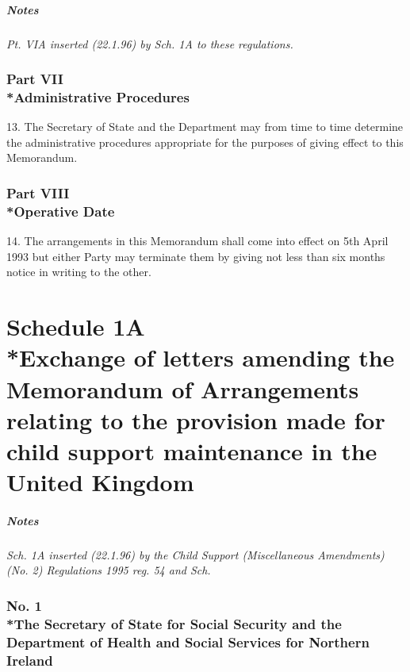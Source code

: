 \documentclass[a4paper]{article}
\newcommand{\parthead}{}
\newcommand\amendment[1]{\subsubsection*{Notes}{\itshape\frenchspacing\footnotesize #1 \par}}
\begin{document}
\amendment{
Pt. VIA inserted (22.1.96) by Sch. 1A to these regulations.
}

\section[Part VII --- Administrative Procedures]{Part VII\\*Administrative Procedures}

\renewcommand\parthead{--- Schedule 1 Part VII}

13.   The Secretary of State and the Department may from time to time determine the administrative procedures appropriate for the purposes of giving effect to this Memorandum.

\section[Part VIII --- Operative Date]{Part VIII\\*Operative Date}

\renewcommand\parthead{--- Schedule 1 Part VIII}

14.   The arrangements in this Memorandum shall come into effect on 5th April 1993 but either Party may terminate them by giving not less than six months notice in writing to the other.

\part[Schedule 1A --- Exchange of letters amending the Memorandum of Arrangements relating to the provision made for child support maintenance in the United Kingdom]{Schedule 1A\\*Exchange of letters amending the Memorandum of Arrangements relating to the provision made for child support maintenance in the United Kingdom}

\renewcommand\parthead{--- Schedule 1A}

\amendment{
Sch. 1A inserted (22.1.96) by the Child Support (Miscellaneous Amendments) (No. 2) Regulations 1995 reg. 54 and Sch.
}

\section*{No. 1\\*The Secretary of State for Social Security and the Department of Health and Social Services for Northern Ireland}
\end{document}
